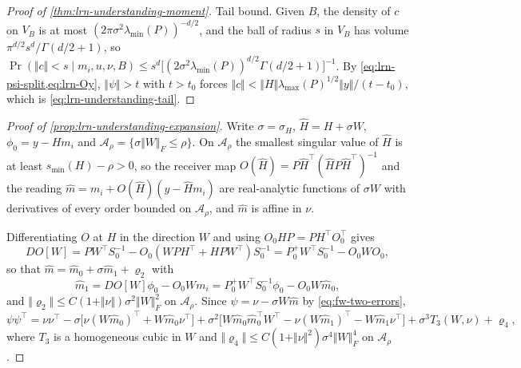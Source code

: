 \begin{proof}[Proof of \cref{thm:lrn-understanding-moment}]
Tail bound. Given $B$, the density of $c$ on $V_B$ is at most $(2\pi\sigma^2\lambda_{\min}(P))^{-d/2}$, and the ball of radius $s$ in $V_B$ has volume $\pi^{d/2}s^d/\Gamma(d/2+1)$, so $\Pr(\Vert c\Vert<s\mid m_i,u,\nu,B)\le s^d\bigl[(2\sigma^2\lambda_{\min}(P))^{d/2}\Gamma(d/2+1)\bigr]^{-1}$. By \cref{eq:lrn-psi-split,eq:lrn-Oy}, $\Vert\psi\Vert>t$ with $t>t_0$ forces $\Vert c\Vert<\Vert H\Vert\lambda_{\max}(P)^{1/2}\Vert y\Vert/(t-t_0)$, which is \cref{eq:lrn-understanding-tail}.
\end{proof}

\begin{proof}[Proof of \cref{prop:lrn-understanding-expansion}]
Write $\sigma=\sigma_H$, $\hat H=H+\sigma W$, $\phi_0=y-Hm_i$ and $\mathcal A_\rho=\{\sigma\Vert W\Vert_F\le\rho\}$. On $\mathcal A_\rho$ the smallest singular value of $\hat H$ is at least $s_{\min}(H)-\rho>0$, so the receiver map $O(\hat H)=P\hat H^\top(\hat HP\hat H^\top)^{-1}$ and the reading $\hat m=m_i+O(\hat H)(y-\hat Hm_i)$ are real-analytic functions of $\sigma W$ with derivatives of every order bounded on $\mathcal A_\rho$, and $\hat m$ is affine in $\nu$.

Differentiating $O$ at $H$ in the direction $W$ and using $O_0HP=PH^\top O_0^\top$ gives
\begin{equation}\label{eq:lrn-DO}
DO[W]=PW^\top S_0^{-1}-O_0(WPH^\top+HPW^\top)S_0^{-1}=P_0^+W^\top S_0^{-1}-O_0WO_0,
\end{equation}
so that $\hat m=\hat m_0+\sigma\hat m_1+\varrho_2$ with
\begin{equation}\label{eq:lrn-m1}
\hat m_1=DO[W]\phi_0-O_0Wm_i=P_0^+W^\top S_0^{-1}\phi_0-O_0W\hat m_0,
\end{equation}
and $\Vert\varrho_2\Vert\le C(1+\Vert\nu\Vert)\sigma^2\Vert W\Vert_F^2$ on $\mathcal A_\rho$. Since $\psi=\nu-\sigma W\hat m$ by \cref{eq:fw-two-errors},
\begin{equation}\label{eq:lrn-psi-orders}
\psi\psi^\top=\nu\nu^\top-\sigma\bigl[\nu(W\hat m_0)^\top+W\hat m_0\nu^\top\bigr]+\sigma^2\bigl[W\hat m_0\hat m_0^\top W^\top-\nu(W\hat m_1)^\top-W\hat m_1\nu^\top\bigr]+\sigma^3T_3(W,\nu)+\varrho_4,
\end{equation}
where $T_3$ is a homogeneous cubic in $W$ and $\Vert\varrho_4\Vert\le C(1+\Vert\nu\Vert^2)\sigma^4\Vert W\Vert_F^4$ on $\mathcal A_\rho$.


\end{proof}
